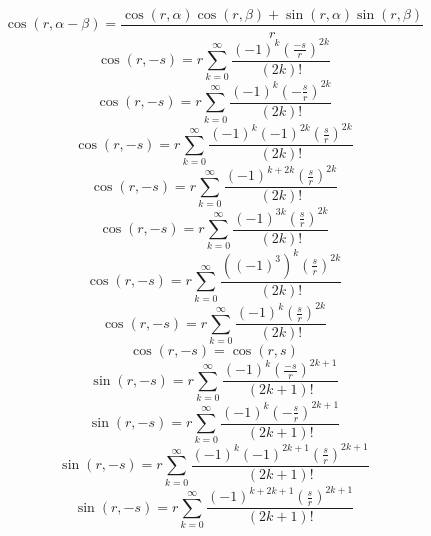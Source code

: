 \documentclass[a4paper,12pt]{report}
\begin{document}
\begin{equation}
\cos(r,\alpha - \beta) = \frac{\cos(r,\alpha) \cos(r,\beta) + \sin(r,\alpha) \sin(r,\beta)}{r}
\end{equation}
\begin{equation}
\cos(r,-s) = r \sum \limits_{k=0}^{\infty} \frac{(-1)^k \left(\frac{-s}{r}\right)^{2k}}{(2k)!}
\end{equation}
\begin{equation}
\cos(r,-s) = r \sum \limits_{k=0}^{\infty} \frac{(-1)^k \left(-\frac{s}{r}\right)^{2k}}{(2k)!}
\end{equation}
\begin{equation}
\cos(r,-s) = r \sum \limits_{k=0}^{\infty} \frac{(-1)^k (-1)^{2k} \left(\frac{s}{r}\right)^{2k}}{(2k)!}
\end{equation}
\begin{equation}
\cos(r,-s) = r \sum \limits_{k=0}^{\infty} \frac{(-1)^{k+2k} \left(\frac{s}{r}\right)^{2k}}{(2k)!}
\end{equation}
\begin{equation}
\cos(r,-s) = r \sum \limits_{k=0}^{\infty} \frac{(-1)^{3k} \left(\frac{s}{r}\right)^{2k}}{(2k)!}
\end{equation}
\begin{equation}
\cos(r,-s) = r \sum \limits_{k=0}^{\infty} \frac{((-1)^3)^k \left(\frac{s}{r}\right)^{2k}}{(2k)!}
\end{equation}
\begin{equation}
\cos(r,-s) = r \sum \limits_{k=0}^{\infty} \frac{(-1)^k \left(\frac{s}{r}\right)^{2k}}{(2k)!}
\end{equation}
\begin{equation}
\cos(r,-s) = \cos(r,s)
\end{equation}
\begin{equation}
\sin(r,-s) = r \sum \limits_{k=0}^{\infty} \frac{(-1)^k \left(\frac{-s}{r}\right)^{2k+1}}{(2k+1)!}
\end{equation}
\begin{equation}
\sin(r,-s) = r \sum \limits_{k=0}^{\infty} \frac{(-1)^k \left(-\frac{s}{r}\right)^{2k+1}}{(2k+1)!}
\end{equation}
\begin{equation}
\sin(r,-s) = r \sum \limits_{k=0}^{\infty} \frac{(-1)^k (-1)^{2k+1} \left(\frac{s}{r}\right)^{2k+1}}{(2k+1)!}
\end{equation}
\begin{equation}
\sin(r,-s) = r \sum \limits_{k=0}^{\infty} \frac{(-1)^{k+2k+1} \left(\frac{s}{r}\right)^{2k+1}}{(2k+1)!}
\end{equation}
\end{document}
